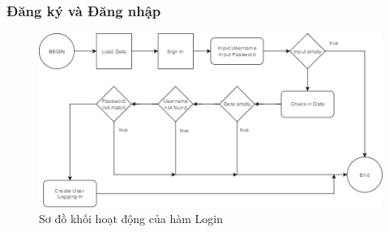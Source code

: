 \documentclass[12pt,a4paper]{report}
\begin{document}
            \subsubsection{Đăng ký và Đăng nhập}
            \begin{figure}[H]
                    \centering
                    \label{F:login}
                    \includegraphics[scale = 1]{Login.png}
                    \caption{Sơ đồ khối hoạt động của hàm Login}
                \end{figure}
\end{document}
